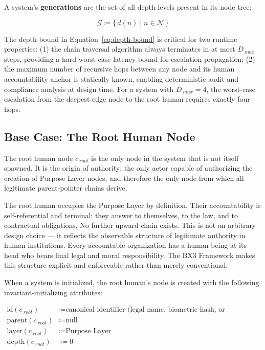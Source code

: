 A system's \textbf{generations} are the set of all depth levels present in its node tree:

\begin{equation}
\mathcal{G} \coloneqq \{\, d(n) \mid n \in \mathcal{N} \,\}
\label{eq:generations-set}
\end{equation}

The depth bound in Equation~\ref{eq:depth-bound} is critical for two runtime properties: (1) the chain traversal algorithm always terminates in at most $D_{\ max}$ steps, providing a hard worst-case latency bound for escalation propagation; (2) the maximum number of recursive hops between any node and its human accountability anchor is statically known, enabling deterministic audit and compliance analysis at design time. For a system with $D_{\ max} = 4$, the worst-case escalation from the deepest edge node to the root human requires exactly four hops.

\subsection{Base Case: The Root Human Node}
\label{sec:root-human-base-case}

The root human node $c_{\ root}$ is the only node in the system that is not itself spawned. It is the origin of authority: the only actor capable of authorizing the creation of Purpose Layer nodes, and therefore the only node from which all legitimate parent-pointer chains derive.

The root human occupies the Purpose Layer by definition. Their accountability is self-referential and terminal: they answer to themselves, to the law, and to contractual obligations. No further upward chain exists. This is not an arbitrary design choice --- it reflects the observable structure of legitimate authority in human institutions. Every accountable organization has a human being at its head who bears final legal and moral responsibility. The BX3 Framework makes this structure explicit and enforceable rather than merely conventional.

When a system is initialized, the root human's node is created with the following invariant-initializing attributes:

\begin{align}
\text{id}(c_{\ root}) &\coloneqq \text{canonical identifier (legal name, biometric hash, or institutional DID)} \label{eq:root-id} \\
\text{parent}(c_{\ root}) &\coloneqq \text{null} \label{eq:root-parent} \\
\text{layer}(c_{\ root}) &\coloneqq \text{Purpose Layer} \label{eq:root-layer} \\
\text{depth}(c_{\ root}) &\coloneqq 0 \label{eq:root-depth}
\end{align}

